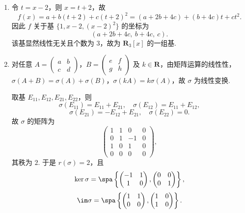 \begin{enumerate}
\begin{enumerate}
        \item 因 $W_1,W_2$ 的方程系数不成比例，故它们为不同的超平面，从而
        \[
            W_1+W_2=\mathbf{R}^4,
        \]
        维数为 $4$，一组基可取标准基 $\{e_1,e_2,e_3,e_4\}$（或 $\{\beta_1,\beta_2,\beta_3,(1,1,1,1)\}$）.

        联立 $W_1,W_2$ 的方程：
        \[
            \begin{cases}
                x_1-x_2+x_3-x_4=0,\\
                x_1+x_2+x_3+x_4=0,
            \end{cases}
        \]
        两式相加得 $x_3=-x_1$，相减得 $x_4=-x_2$，故
        \[
            W_1\cap W_2=\spa\{(1,0,-1,0),\ (0,1,0,-1)\},
        \]
        维数为 $2$.
    \end{enumerate}

    \item 令 $t=x-2$，则 $x=t+2$，故
    \[
        f(x)=a+b(t+2)+c(t+2)^2
        =(a+2b+4c)+(b+4c)t+ct^2.
    \]
    因此 $f$ 关于基 $\{1,x-2,(x-2)^2\}$ 的坐标为
    \[
        (a+2b+4c,\ b+4c,\ c).
    \]
    该基显然线性无关且个数为 $3$，故为 $\mathbf{R}_3[x]$ 的一组基.

    \item 对任意 $A=\begin{pmatrix}a&b\\c&d\end{pmatrix}$，$B=\begin{pmatrix}e&f\\g&h\end{pmatrix}$ 及 $k\in\mathbf{R}$，由矩阵运算的线性性，$\sigma(A+B)=\sigma(A)+\sigma(B)$，$\sigma(kA)=k\sigma(A)$，故 $\sigma$ 为线性变换.

    取基 $E_{11},E_{12},E_{21},E_{22}$，则
    \[
        \sigma(E_{11})=E_{11}+E_{21},\quad
        \sigma(E_{12})=E_{11}+E_{12},
    \]
    \[
        \sigma(E_{21})=-E_{12}+E_{21},\quad
        \sigma(E_{22})=0.
    \]
    故 $\sigma$ 的矩阵为
    \[
        \begin{pmatrix}
            1&1&0&0\\
            0&1&-1&0\\
            1&0&1&0\\
            0&0&0&0
        \end{pmatrix},
    \]
    其秩为 $2$. 于是 $r(\sigma)=2$，且
    \[
        \ker\sigma=\spa\left\{\begin{pmatrix}-1&1\\1&0\end{pmatrix},
        \begin{pmatrix}0&0\\0&1\end{pmatrix}\right\},
    \]
    \[
        \im\sigma=\spa\left\{\begin{pmatrix}1&1\\0&0\end{pmatrix},
        \begin{pmatrix}1&0\\1&0\end{pmatrix}\right\}.
    \]


\end{enumerate}
